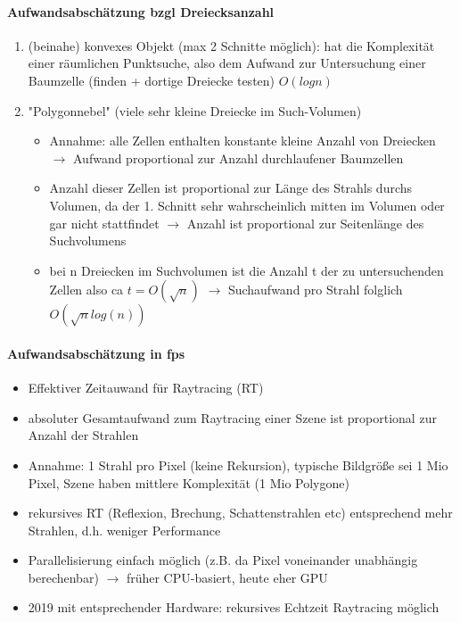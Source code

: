 \documentclass[10pt,landscape]{article}
\begin{document}
\begin{multicols}{3}
  \paragraph{Aufwandsabschätzung bzgl Dreiecksanzahl}
  \begin{enumerate}
    \item (beinahe) konvexes Objekt (max 2 Schnitte möglich): hat die Komplexität einer räumlichen Punktsuche, also dem Aufwand zur Untersuchung einer Baumzelle (finden + dortige Dreiecke testen) $O(log n)$
    \item "Polygonnebel" (viele sehr kleine Dreiecke im Such-Volumen)
          \begin{itemize}
            \item Annahme: alle Zellen enthalten konstante kleine Anzahl von Dreiecken $\rightarrow$ Aufwand proportional zur Anzahl durchlaufener Baumzellen
            \item Anzahl dieser Zellen ist proportional zur Länge des Strahls durchs Volumen, da der 1. Schnitt sehr wahrscheinlich mitten im Volumen oder gar nicht stattfindet $\rightarrow$ Anzahl ist proportional zur Seitenlänge des Suchvolumens
            \item bei n Dreiecken im Suchvolumen ist die Anzahl t der zu untersuchenden Zellen also ca $t=O(\sqrt{n})$ $\rightarrow$ Suchaufwand pro Strahl folglich $O(\sqrt{n} log (n))$
          \end{itemize}
  \end{enumerate}
  
  \paragraph{Aufwandsabschätzung in fps}
  \begin{itemize}
    \item Effektiver Zeitauwand für Raytracing (RT)
    \item absoluter Gesamtaufwand zum Raytracing einer Szene ist proportional zur Anzahl der Strahlen
    \item Annahme: 1 Strahl pro Pixel (keine Rekursion), typische Bildgröße sei 1 Mio Pixel, Szene haben mittlere Komplexität (1 Mio Polygone)
    \item rekursives RT (Reflexion, Brechung, Schattenstrahlen etc) entsprechend mehr Strahlen, d.h. weniger Performance
    \item Parallelisierung einfach möglich (z.B. da Pixel voneinander unabhängig berechenbar) $\rightarrow$ früher CPU-basiert, heute eher GPU
    \item 2019 mit entsprechender Hardware: rekursives Echtzeit Raytracing möglich
  \end{itemize}
  

\end{multicols}
\end{document}

